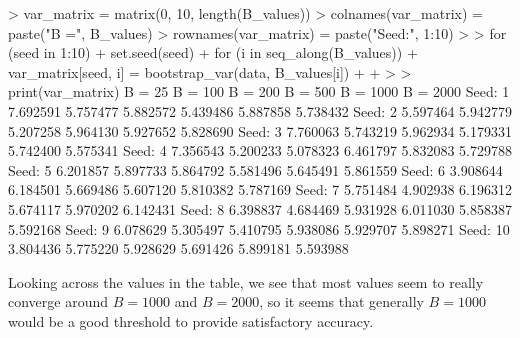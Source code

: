 \documentclass{article}
\begin{document}
{\begin{spverbatim}
> var_matrix = matrix(0, 10, length(B_values))
> colnames(var_matrix) = paste("B =", B_values)
> rownames(var_matrix) = paste("Seed:", 1:10)
> 
> for (seed in 1:10) {
+   set.seed(seed)
+   for (i in seq_along(B_values)) {
+     var_matrix[seed, i] = bootstrap_var(data, B_values[i])
+   }
+ }
> 
> print(var_matrix)
           B = 25  B = 100  B = 200  B = 500 B = 1000 B = 2000
Seed: 1  7.692591 5.757477 5.882572 5.439486 5.887858 5.738432
Seed: 2  5.597464 5.942779 5.207258 5.964130 5.927652 5.828690
Seed: 3  7.760063 5.743219 5.962934 5.179331 5.742400 5.575341
Seed: 4  7.356543 5.200233 5.078323 6.461797 5.832083 5.729788
Seed: 5  6.201857 5.897733 5.864792 5.581496 5.645491 5.861559
Seed: 6  3.908644 6.184501 5.669486 5.607120 5.810382 5.787169
Seed: 7  5.751484 4.902938 6.196312 5.674117 5.970202 6.142431
Seed: 8  6.398837 4.684469 5.931928 6.011030 5.858387 5.592168
Seed: 9  6.078629 5.305497 5.410795 5.938086 5.929707 5.898271
Seed: 10 3.804436 5.775220 5.928629 5.691426 5.899181 5.593988
\end{spverbatim}

Looking across the values in the table, we see that most values seem to really converge around \(B = 1000\) and \(B = 2000\), so it seems that generally \(B = 1000\) would be a good threshold to provide satisfactory accuracy.

}
\end{document}
